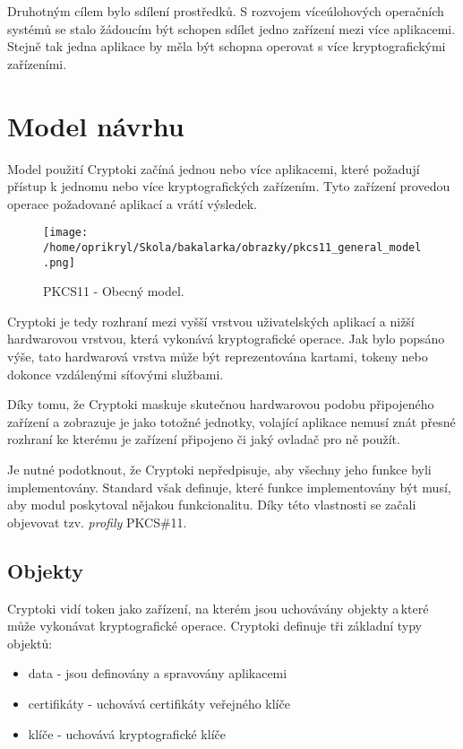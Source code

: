 \documentclass[]{fithesis3}
\begin{document}
	Druhotným cílem bylo sdílení prostředků. S rozvojem víceúlohových operačních systémů se 		stalo žádoucím být schopen sdílet jedno zařízení mezi více aplikacemi. Stejně tak jedna 			aplikace by měla být schopna operovat s více kryptografickými zařízeními.

	\section{Model návrhu}

	Model použití Cryptoki začíná jednou nebo více aplikacemi, které požadují přístup k jednomu 		nebo více kryptografických zařízením. Tyto zařízení provedou operace požadované aplikací a 		vrátí výsledek.
	\begin{figure}[!ht]
  		\begin{minipage}{1.00\textwidth}
    			\texttt{[image: /home/oprikryl/Skola/bakalarka/obrazky/pkcs11\_general\_model.png]}
  		\end{minipage}
 		\caption{PKCS11 - Obecný model.}
  		\label{fig:PKCS11 - Obecný model.}
	\end{figure}

	Cryptoki je tedy rozhraní mezi vyšší vrstvou uživatelských aplikací a nižší hardwarovou 			vrstvou, která vykonává kryptografické operace. Jak bylo popsáno výše, tato hardwarová 			vrstva může být reprezentována kartami, tokeny nebo dokonce vzdálenými síťovými službami.

	Díky tomu, že Cryptoki maskuje skutečnou hardwarovou podobu připojeného zařízení a 			zobrazuje je jako totožné jednotky, volající aplikace nemusí znát přesné rozhraní ke kterému je 		zařízení připojeno či jaký ovladač pro ně použít.

	Je nutné podotknout, že Cryptoki nepředpisuje, aby všechny jeho funkce byli implementovány. 		Standard však definuje, které funkce implementovány být musí, aby modul poskytoval nějakou 		funkcionalitu. Díky této vlastnosti se začali objevovat tzv. \textit{profily} PKCS\#11.

		\subsection{Objekty}

		Cryptoki vidí token jako zařízení, na kterém jsou uchovávány objekty a\,které může vykonávat 			kryptografické operace. Cryptoki definuje tři základní typy objektů:
		\begin{itemize}
			\item data - jsou definovány a spravovány aplikacemi
			\item certifikáty - uchovává certifikáty veřejného klíče
			\item klíče - uchovává kryptografické klíče
		\end{itemize}
\end{document}
